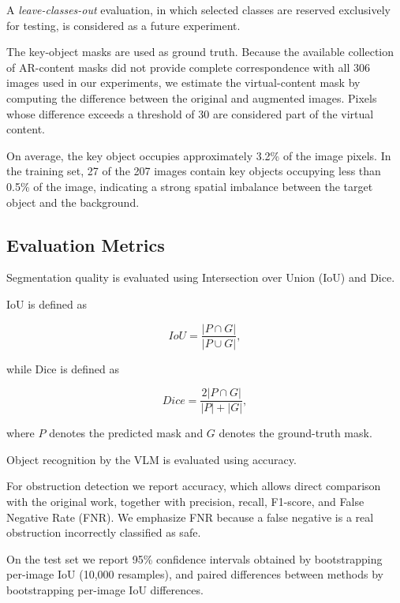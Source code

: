\documentclass[conference]{IEEEtran}
\begin{document}
A \textit{leave-classes-out} evaluation, in which selected classes are reserved exclusively for testing, is considered as a future experiment.

The key-object masks are used as ground truth. Because the available collection of AR-content masks did not provide complete correspondence with all 306 images used in our experiments, we estimate the virtual-content mask by computing the difference between the original and augmented images. Pixels whose difference exceeds a threshold of 30 are considered part of the virtual content.

On average, the key object occupies approximately 3.2\% of the image pixels. In the training set, 27 of the 207 images contain key objects occupying less than 0.5\% of the image, indicating a strong spatial imbalance between the target object and the background.


\subsection{Evaluation Metrics}

Segmentation quality is evaluated using Intersection over Union (IoU) and Dice.

IoU is defined as

\begin{equation}
IoU =
\frac{|P \cap G|}
{|P \cup G|},
\end{equation}

while Dice is defined as

\begin{equation}
Dice =
\frac{2|P \cap G|}
{|P| + |G|},
\end{equation}

where $P$ denotes the predicted mask and $G$ denotes the ground-truth mask.

Object recognition by the VLM is evaluated using accuracy.

For obstruction detection we report accuracy, which allows direct comparison with the original work, together with precision, recall, F1-score, and False Negative Rate (FNR). We emphasize FNR because a false negative is a real obstruction incorrectly classified as safe.

On the test set we report 95\% confidence intervals obtained by bootstrapping per-image IoU (10{,}000 resamples), and paired differences between methods by bootstrapping per-image IoU differences.

\end{document}
